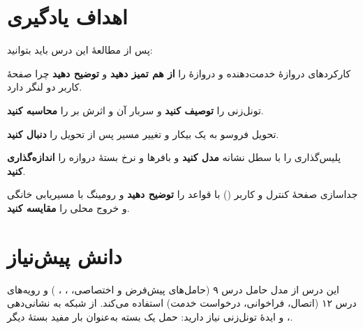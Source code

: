 \documentclass[11pt,a4paper]{article}
\begin{document}
\ACNcover

\section{اهداف یادگیری}
پس از مطالعهٔ این درس باید بتوانید:
\begin{objectives}
  \item کارکردهای دروازهٔ خدمت‌دهنده و دروازهٔ  را \textbf{از هم تمیز دهید} و \textbf{توضیح دهید} چرا صفحهٔ کاربر
        دو لنگر دارد.
  \item تونل‌زنی  را \textbf{توصیف کنید} و سربار آن و اثرش بر  را \textbf{محاسبه کنید}.
  \item تحویل فروسو به یک  بیکار و تغییر مسیر پس از تحویل را \textbf{دنبال کنید}.
  \item پلیس‌گذاری  را با سطل نشانه \textbf{مدل کنید} و بافرها و نرخ بستهٔ دروازه را \textbf{اندازه‌گذاری کنید}.
  \item جداسازی صفحهٔ کنترل و کاربر () با قواعد  را \textbf{توضیح دهید} و رومینگ با مسیریابی خانگی و
        خروج محلی را \textbf{مقایسه کنید}.
\end{objectives}

\section{دانش پیش‌نیاز}
این درس از مدل حامل درس ۹ (حامل‌های پیش‌فرض و اختصاصی، ، ، ) و رویه‌های  درس ۱۲
(اتصال، فراخوانی، درخواست خدمت) استفاده می‌کند. از شبکه به نشانی‌دهی ،  و ایدهٔ تونل‌زنی نیاز دارید:
حمل یک بسته به‌عنوان بار مفید بستهٔ دیگر.
\end{document}
